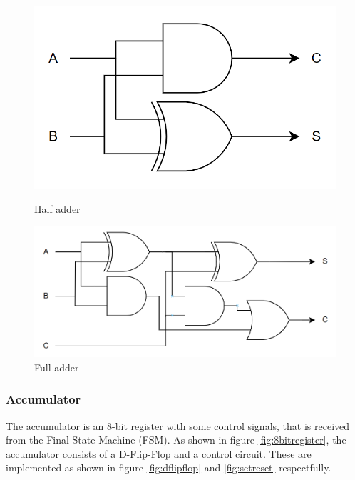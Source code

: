\begin{figure}[H]
\begin{minipage}{0.4\textwidth}
    \centering
    \includegraphics[width=\linewidth]{Figures/halfadder.png}
    \caption{Half adder}
    \label{fig:halfadder}
\end{minipage}
\begin{minipage}{0.6\textwidth}
    \centering
    \includegraphics[width=\linewidth]{Figures/fulladder.png}
    \caption{Full adder}
    \label{fig:fulladder}
\end{minipage}
\end{figure}


\subsubsection{Accumulator}
\label{subsubsec:accumulator}
The accumulator is an 8-bit register with some control signals, that is received from the Final State Machine (FSM). As shown in figure \ref{fig:8bitregister}, the accumulator consists of a D-Flip-Flop and a control circuit. These are implemented as shown in figure \ref{fig:dflipflop} and \ref{fig:setreset} respectfully.

